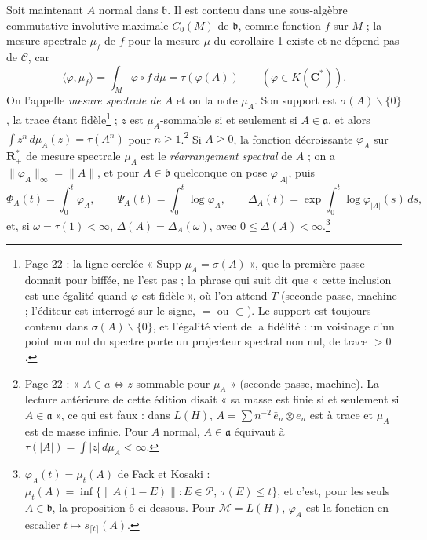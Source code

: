 \documentclass[11pt,a4paper]{article}
\begin{document}
Soit maintenant $A$ normal dans $\mathfrak{b}$. Il est contenu dans une
sous-algèbre commutative involutive maximale $C_0(M)$ de $\mathfrak{b}$,
comme fonction $f$ sur $M$ ; la mesure spectrale $\mu_f$ de $f$ pour la
mesure $\mu$ du corollaire 1 existe et ne dépend pas de $\mathcal{C}$, car
\[
  \langle \varphi, \mu_f\rangle = \int_M \varphi\circ f\,d\mu = \tau(\varphi(A))
  \qquad (\varphi \in K(\mathbf{C}^{*})) .
\]
On l'appelle \emph{mesure spectrale de $A$} et on la note $\mu_A$. Son
support est $\sigma(A) \smallsetminus \{0\}$, la trace étant
fidèle\footnote{Page 22 : la ligne cerclée « Supp $\mu_A = \sigma(A)$ »,
que la première passe donnait pour biffée, ne l'est pas ; la phrase qui suit
dit que « cette inclusion est une égalité quand $\varphi$ est fidèle », où
l'on attend $T$ (seconde passe, machine ; l'éditeur est interrogé sur le
signe, $=$ ou $\subset$). Le support est toujours contenu dans $\sigma(A)
\smallsetminus \{0\}$, et l'égalité vient de la fidélité : un voisinage d'un
point non nul du spectre porte un projecteur spectral non nul, de trace $> 0$.}
; $z$ est $\mu_A$-sommable si et seulement si $A \in \mathfrak{a}$, et alors
$\int z^n\,d\mu_A(z) = \tau(A^n)$ pour $n \geq 1$.\footnote{Page 22 : « $A
\in \underline{a} \Longleftrightarrow z$ sommable pour $\mu_A$ » (seconde
passe, machine). La lecture antérieure de cette édition disait « sa masse est
finie si et seulement si $A \in \mathfrak{a}$ », ce qui est faux : dans
$L(H)$, $A = \sum n^{-2}\,\bar e_n \otimes e_n$ est à trace et $\mu_A$ est de
masse infinie. Pour $A$ normal, $A \in \mathfrak{a}$ équivaut à $\tau(|A|) =
\int |z|\,d\mu_A < \infty$.} Si $A \geq 0$, la fonction
décroissante $\varphi_A$ sur $\mathbf{R}^{*}_{+}$ de mesure spectrale $\mu_A$
est le \emph{réarrangement spectral} de $A$ ; on a $\|\varphi_A\|_\infty =
\|A\|$, et pour $A \in \mathfrak{b}$ quelconque on pose $\varphi_{|A|}$, puis
\[
  \Phi_A(t) = \int_0^t \varphi_A, \qquad
  \Psi_A(t) = \int_0^t \log\varphi_A, \qquad
  \Delta_A(t) = \exp\int_0^t \log\varphi_{|A|}(s)\,ds,
\]
et, si $\omega = \tau(1) < \infty$, $\Delta(A) = \Delta_A(\omega)$, avec
$0 \leq \Delta(A) < \infty$.\footnote{$\varphi_A(t) = \mu_t(A)$ de Fack et
Kosaki : $\mu_t(A) = \inf\{\|A(1-E)\| : E \in \mathcal{P},\ \tau(E) \leq t\}$,
et c'est, pour les seuls $A \in \mathfrak{b}$, la proposition 6
ci-dessous. Pour $\mathcal{M} = L(H)$, $\varphi_A$ est la
fonction en escalier $t \mapsto s_{\lceil t\rceil}(A)$.}
\end{document}
